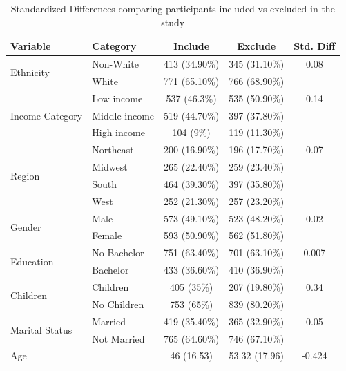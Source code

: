 \documentclass[12pt]{article}
\begin{document}
\begin{table}[htbp]
\centering
\footnotesize
\caption{Standardized Differences comparing participants included vs excluded in the study}
\label{tab:Incomplete}
\begin{threeparttable}
\begin{tabular}{llccc}
\toprule
\textbf{Variable} & \textbf{Category} & \textbf{Include} & \textbf{Exclude} & \textbf{Std. Diff} \\
\midrule
\multirow{2}{*}{Ethnicity} & Non-White & 413 (34.90\%) & 345 (31.10\%) & 0.08 \\
                           & White     & 771 (65.10\%) & 766 (68.90\%) & \\
\midrule
\multirow{3}{*}{Income Category} & Low income    & 537 (46.3\%) & 535 (50.90\%) & 0.14 \\
                                 & Middle income & 519 (44.70\%) & 397 (37.80\%) & \\
                                 & High income   & 104 (9\%)  & 119 (11.30\%) & \\
\midrule
\multirow{4}{*}{Region} & Northeast & 200 (16.90\%) & 196 (17.70\%) & 0.07 \\
                        & Midwest   & 265 (22.40\%) & 259 (23.40\%) & \\
                        & South     & 464 (39.30\%) & 397 (35.80\%) & \\
                        & West      & 252 (21.30\%) & 257 (23.20\%) & \\
\midrule
\multirow{2}{*}{Gender} & Male   & 573 (49.10\%) & 523 (48.20\%) & 0.02 \\
                        & Female & 593 (50.90\%) & 562 (51.80\%) & \\
\midrule
\multirow{2}{*}{Education} & No Bachelor & 751 (63.40\%) & 701 (63.10\%) & 0.007 \\
                           & Bachelor    &  433   (36.60\%)        &   410 (36.90\%)          &  \\
\midrule
\multirow{2}{*}{Children} & Children     & 405 (35\%) & 207 (19.80\%) & 0.34 \\
                          & No Children  & 753 (65\%) & 839 (80.20\%) & \\
\midrule
\multirow{2}{*}{Marital Status} & Married     & 419 (35.40\%) & 365 (32.90\%) & 0.05 \\
                                & Not Married &   765 (64.60\%)          &    746 (67.10\%)         & \\
\midrule
Age  & & 46 (16.53) & 53.32 (17.96) & -0.424 \\
\bottomrule
\end{tabular}
\begin{tablenotes}


\end{tablenotes}
\end{threeparttable}
\end{table}
\end{document}
